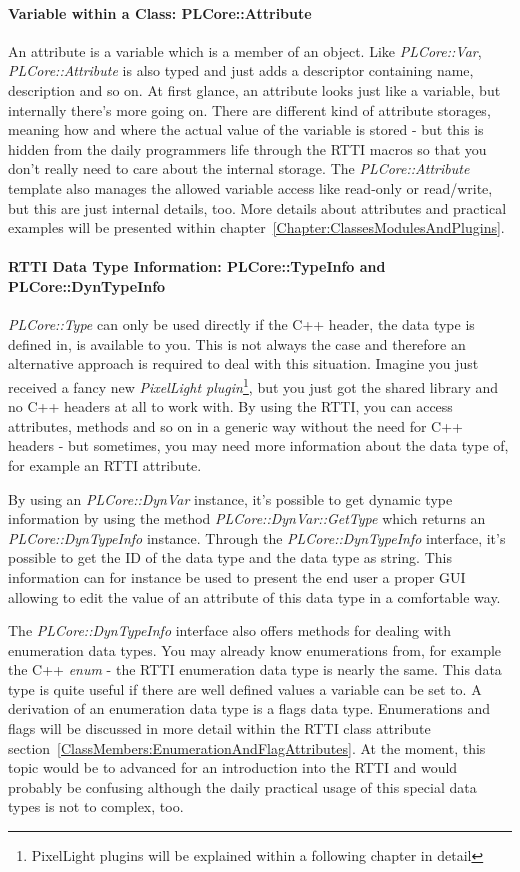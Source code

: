 \paragraph{Variable within a Class: PLCore::Attribute}
An attribute is a variable which is a member of an object. Like \emph{PLCore::Var}, \emph{PLCore::Attribute} is also typed and just adds a descriptor containing name, description and so on. At first glance, an attribute looks just like a variable, but internally there's more going on. There are different kind of attribute storages, meaning how and where the actual value of the variable is stored - but this is hidden from the daily programmers life through the \ac{RTTI} macros so that you don't really need to care about the internal storage. The \emph{PLCore::Attribute} template also manages the allowed variable access like read-only or read/write, but this are just internal details, too. More details about attributes and practical examples will be presented within chapter~\ref{Chapter:ClassesModulesAndPlugins}.


\paragraph{\ac{RTTI} Data Type Information: PLCore::TypeInfo and PLCore::DynTypeInfo}
\emph{PLCore::Type} can only be used directly if the C++ header, the data type is defined in, is available to you. This is not always the case and therefore an alternative approach is required to deal with this situation. Imagine you just received a fancy new \emph{PixelLight plugin}\footnote{PixelLight plugins will be explained within a following chapter in detail}, but you just got the shared library and no C++ headers at all to work with. By using the \ac{RTTI}, you can access attributes, methods and so on in a generic way without the need for C++ headers - but sometimes, you may need more information about the data type of, for example an \ac{RTTI} attribute.

By using an \emph{PLCore::DynVar} instance, it's possible to get dynamic type information by using the method \emph{PLCore::DynVar::GetType} which returns an \emph{PLCore::DynTypeInfo} instance. Through the \emph{PLCore::DynTypeInfo} interface, it's possible to get the ID of the data type and the data type as string. This information can for instance be used to present the end user a proper \ac{GUI} allowing to edit the value of an attribute of this data type in a comfortable way.

The \emph{PLCore::DynTypeInfo} interface also offers methods for dealing with enumeration data types. You may already know enumerations from, for example the C++ \emph{enum} - the \ac{RTTI} enumeration data type is nearly the same. This data type is quite useful if there are well defined values a variable can be set to. A derivation of an enumeration data type is a flags data type. Enumerations and flags will be discussed in more detail within the \ac{RTTI} class attribute section~\ref{ClassMembers:EnumerationAndFlagAttributes}. At the moment, this topic would be to advanced for an introduction into the \ac{RTTI} and would probably be confusing although the daily practical usage of this special data types is not to complex, too.


